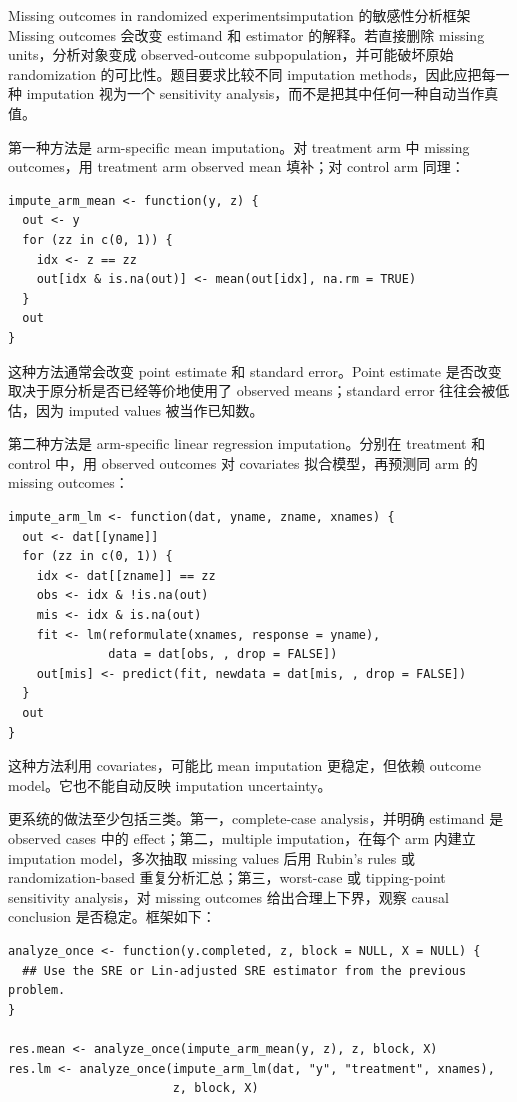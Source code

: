 \begin{exercisesolution}{Missing outcomes in randomized experiments}{imputation 的敏感性分析框架}
Missing outcomes 会改变 estimand 和 estimator 的解释。若直接删除 missing units，分析对象变成 observed-outcome subpopulation，并可能破坏原始 randomization 的可比性。题目要求比较不同 imputation methods，因此应把每一种 imputation 视为一个 sensitivity analysis，而不是把其中任何一种自动当作真值。

第一种方法是 arm-specific mean imputation。对 treatment arm 中 missing outcomes，用 treatment arm observed mean 填补；对 control arm 同理：
\begin{lstlisting}
impute_arm_mean <- function(y, z) {
  out <- y
  for (zz in c(0, 1)) {
    idx <- z == zz
    out[idx & is.na(out)] <- mean(out[idx], na.rm = TRUE)
  }
  out
}
\end{lstlisting}
这种方法通常会改变 point estimate 和 standard error。Point estimate 是否改变取决于原分析是否已经等价地使用了 observed means；standard error 往往会被低估，因为 imputed values 被当作已知数。

第二种方法是 arm-specific linear regression imputation。分别在 treatment 和 control 中，用 observed outcomes 对 covariates 拟合模型，再预测同 arm 的 missing outcomes：
\begin{lstlisting}
impute_arm_lm <- function(dat, yname, zname, xnames) {
  out <- dat[[yname]]
  for (zz in c(0, 1)) {
    idx <- dat[[zname]] == zz
    obs <- idx & !is.na(out)
    mis <- idx & is.na(out)
    fit <- lm(reformulate(xnames, response = yname),
              data = dat[obs, , drop = FALSE])
    out[mis] <- predict(fit, newdata = dat[mis, , drop = FALSE])
  }
  out
}
\end{lstlisting}
这种方法利用 covariates，可能比 mean imputation 更稳定，但依赖 outcome model。它也不能自动反映 imputation uncertainty。

更系统的做法至少包括三类。第一，complete-case analysis，并明确 estimand 是 observed cases 中的 effect；第二，multiple imputation，在每个 arm 内建立 imputation model，多次抽取 missing values 后用 Rubin's rules 或 randomization-based 重复分析汇总；第三，worst-case 或 tipping-point sensitivity analysis，对 missing outcomes 给出合理上下界，观察 causal conclusion 是否稳定。框架如下：
\begin{lstlisting}
analyze_once <- function(y.completed, z, block = NULL, X = NULL) {
  ## Use the SRE or Lin-adjusted SRE estimator from the previous problem.
}

res.mean <- analyze_once(impute_arm_mean(y, z), z, block, X)
res.lm <- analyze_once(impute_arm_lm(dat, "y", "treatment", xnames),
                       z, block, X)


\end{lstlisting}
\end{exercisesolution}
